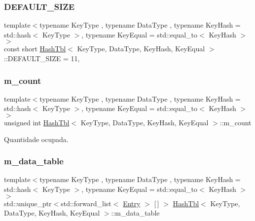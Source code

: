 \subsubsection{\texorpdfstring{D\+E\+F\+A\+U\+L\+T\+\_\+\+S\+I\+ZE}{DEFAULT\_SIZE}}
{\footnotesize\ttfamily template$<$typename Key\+Type , typename Data\+Type , typename Key\+Hash  = std\+::hash$<$ Key\+Type $>$, typename Key\+Equal  = std\+::equal\+\_\+to$<$ Key\+Hash $>$$>$ \\
const short \hyperlink{classHashTbl}{Hash\+Tbl}$<$ Key\+Type, Data\+Type, Key\+Hash, Key\+Equal $>$\+::D\+E\+F\+A\+U\+L\+T\+\_\+\+S\+I\+ZE = 11\hspace{0.3cm}{\ttfamily [static]}, {\ttfamily [private]}}

\mbox{\label{classHashTbl_a2ecc779b66589db1ed8167fe9b81a6c9}} 
\subsubsection{\texorpdfstring{m\+\_\+count}{m\_count}}
{\footnotesize\ttfamily template$<$typename Key\+Type , typename Data\+Type , typename Key\+Hash  = std\+::hash$<$ Key\+Type $>$, typename Key\+Equal  = std\+::equal\+\_\+to$<$ Key\+Hash $>$$>$ \\
unsigned int \hyperlink{classHashTbl}{Hash\+Tbl}$<$ Key\+Type, Data\+Type, Key\+Hash, Key\+Equal $>$\+::m\+\_\+count\hspace{0.3cm}{\ttfamily [private]}}



Quantidade ocupada. 

\mbox{\label{classHashTbl_af4bbcaeab668db62a8ca1d353377a4a4}} 
\subsubsection{\texorpdfstring{m\+\_\+data\+\_\+table}{m\_data\_table}}
{\footnotesize\ttfamily template$<$typename Key\+Type , typename Data\+Type , typename Key\+Hash  = std\+::hash$<$ Key\+Type $>$, typename Key\+Equal  = std\+::equal\+\_\+to$<$ Key\+Hash $>$$>$ \\
std\+::unique\+\_\+ptr$<$std\+::forward\+\_\+list$<$ \hyperlink{classHashTbl_ab9ca4e5818aa21557c7cedaf02a1e7db}{Entry} $>$ \mbox{[}$\,$\mbox{]} $>$ \hyperlink{classHashTbl}{Hash\+Tbl}$<$ Key\+Type, Data\+Type, Key\+Hash, Key\+Equal $>$\+::m\+\_\+data\+\_\+table\hspace{0.3cm}{\ttfamily [private]}}




